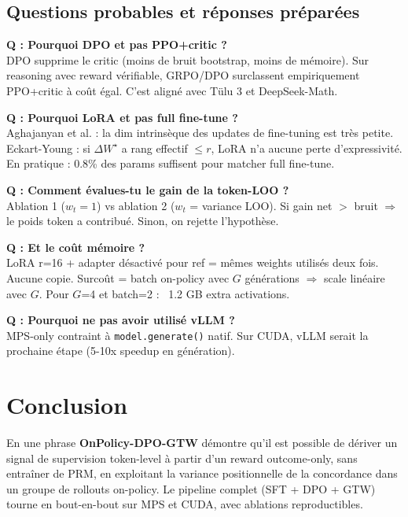 \documentclass[10pt,a4paper]{article}
\begin{document}
\subsection{Questions probables et réponses préparées}

\textbf{Q : Pourquoi DPO et pas PPO+critic ?} \\
DPO supprime le critic (moins de bruit bootstrap, moins de mémoire). Sur reasoning avec reward vérifiable, GRPO/DPO surclassent empiriquement PPO+critic à coût égal. C'est aligné avec Tülu 3 et DeepSeek-Math.

\textbf{Q : Pourquoi LoRA et pas full fine-tune ?} \\
Aghajanyan et al. : la dim intrinsèque des updates de fine-tuning est très petite. Eckart-Young : si $\Delta W^\star$ a rang effectif $\le r$, LoRA n'a aucune perte d'expressivité. En pratique : 0.8\% des params suffisent pour matcher full fine-tune.

\textbf{Q : Comment évalues-tu le gain de la token-LOO ?} \\
Ablation 1 ($w_t = 1$) vs ablation 2 ($w_t$ = variance LOO). Si gain net $>$ bruit $\Rightarrow$ le poids token a contribué. Sinon, on rejette l'hypothèse.

\textbf{Q : Et le coût mémoire ?} \\
LoRA r=16 + adapter désactivé pour ref = mêmes weights utilisés deux fois. Aucune copie. Surcoût = batch on-policy avec $G$ générations $\Rightarrow$ scale linéaire avec $G$. Pour $G$=4 et batch=2 : ~1.2 GB extra activations.

\textbf{Q : Pourquoi ne pas avoir utilisé vLLM ?} \\
MPS-only contraint à \texttt{model.generate()} natif. Sur CUDA, vLLM serait la prochaine étape (5-10x speedup en génération).

\section{Conclusion}

\begin{result}{En une phrase}
\textbf{OnPolicy-DPO-GTW} démontre qu'il est possible de dériver un signal de supervision token-level à partir d'un reward outcome-only, sans entraîner de PRM, en exploitant la variance positionnelle de la concordance dans un groupe de rollouts on-policy. Le pipeline complet (SFT + DPO + GTW) tourne en bout-en-bout sur MPS et CUDA, avec ablations reproductibles.
\end{result}
\end{document}
